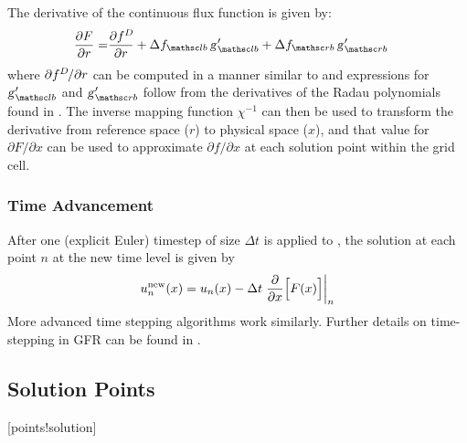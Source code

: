 The derivative of the continuous flux function is given by:
%
\begin{align}
     \frac{\partial \fC}{\partial r}
  =& \frac{\partial \fD}{\partial r}
  +  \fluxjumpL{} \, \gL' + \fluxjumpR{} \, \gR'
\end{align}
%
where $\partial f^D_{}\mspace{-2.0mu}/\partial r$ can be computed in a manner similar to
 and expressions for $\gL'$ and $\gR'$
follow from the derivatives of the Radau polynomials found in
.
%
The inverse mapping function $\chi^{-1}$ can then be used to transform
the derivative from reference space ($r$) to physical space ($x$),
and that value for $\partial F/\partial x$ can be used to approximate
$\partial f/\partial x$ at each solution point within the grid cell.


\subsubsection{Time Advancement}
\label{SEC:Intro:FR:Time_Advancement}


After one (explicit Euler) timestep of size $\Delta t$ is applied to
, the solution at each point $n$ at the new time level
is given by
\begin{gather}
  u_n^{\text{new}} (x)
= u_n              (x)
- \Delta t \left. \frac{\partial}{\partial x} \Bigl[ F(x) \Bigr]
           \right|_n
\end{gather}
%
More advanced time stepping algorithms work similarly.
%
Further details on time-stepping in GFR can be found in .


\subsection{Solution Points}
\label{SEC:Intro:Solution_Points}
\key*{}[points!solution]


